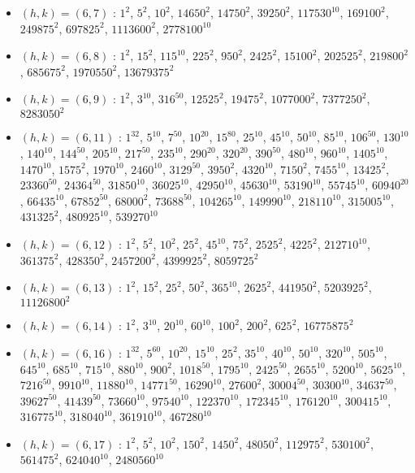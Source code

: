 \begin{itemize}
\item $(h,k)=(6,7)$ : $1^{2}$, $5^{2}$, $10^{2}$, $14650^{2}$, $14750^{2}$, $39250^{2}$, $117530^{10}$, $169100^{2}$, $249875^{2}$, $697825^{2}$, $1113600^{2}$, $2778100^{10}$
\item $(h,k)=(6,8)$ : $1^{2}$, $15^{2}$, $115^{10}$, $225^{2}$, $950^{2}$, $2425^{2}$, $15100^{2}$, $202525^{2}$, $219800^{2}$, $685675^{2}$, $1970550^{2}$, $13679375^{2}$
\item $(h,k)=(6,9)$ : $1^{2}$, $3^{10}$, $316^{50}$, $12525^{2}$, $19475^{2}$, $1077000^{2}$, $7377250^{2}$, $8283050^{2}$
\item $(h,k)=(6,11)$ : $1^{32}$, $5^{10}$, $7^{50}$, $10^{20}$, $15^{80}$, $25^{10}$, $45^{10}$, $50^{10}$, $85^{10}$, $106^{50}$, $130^{10}$, $140^{10}$, $144^{50}$, $205^{10}$, $217^{50}$, $235^{10}$, $290^{20}$, $320^{20}$, $390^{50}$, $480^{10}$, $960^{10}$, $1405^{10}$, $1470^{10}$, $1575^{2}$, $1970^{10}$, $2460^{10}$, $3129^{50}$, $3950^{2}$, $4320^{10}$, $7150^{2}$, $7455^{10}$, $13425^{2}$, $23360^{50}$, $24364^{50}$, $31850^{10}$, $36025^{10}$, $42950^{10}$, $45630^{10}$, $53190^{10}$, $55745^{10}$, $60940^{20}$, $66435^{10}$, $67852^{50}$, $68000^{2}$, $73688^{50}$, $104265^{10}$, $149990^{10}$, $218110^{10}$, $315005^{10}$, $431325^{2}$, $480925^{10}$, $539270^{10}$
\item $(h,k)=(6,12)$ : $1^{2}$, $5^{2}$, $10^{2}$, $25^{2}$, $45^{10}$, $75^{2}$, $2525^{2}$, $4225^{2}$, $212710^{10}$, $361375^{2}$, $428350^{2}$, $2457200^{2}$, $4399925^{2}$, $8059725^{2}$
\item $(h,k)=(6,13)$ : $1^{2}$, $15^{2}$, $25^{2}$, $50^{2}$, $365^{10}$, $2625^{2}$, $441950^{2}$, $5203925^{2}$, $11126800^{2}$
\item $(h,k)=(6,14)$ : $1^{2}$, $3^{10}$, $20^{10}$, $60^{10}$, $100^{2}$, $200^{2}$, $625^{2}$, $16775875^{2}$
\item $(h,k)=(6,16)$ : $1^{32}$, $5^{60}$, $10^{20}$, $15^{10}$, $25^{2}$, $35^{10}$, $40^{10}$, $50^{10}$, $320^{10}$, $505^{10}$, $645^{10}$, $685^{10}$, $715^{10}$, $880^{10}$, $900^{2}$, $1018^{50}$, $1795^{10}$, $2425^{50}$, $2655^{10}$, $5200^{10}$, $5625^{10}$, $7216^{50}$, $9910^{10}$, $11880^{10}$, $14771^{50}$, $16290^{10}$, $27600^{2}$, $30004^{50}$, $30300^{10}$, $34637^{50}$, $39627^{50}$, $41439^{50}$, $73660^{10}$, $97540^{10}$, $122370^{10}$, $172345^{10}$, $176120^{10}$, $300415^{10}$, $316775^{10}$, $318040^{10}$, $361910^{10}$, $467280^{10}$
\item $(h,k)=(6,17)$ : $1^{2}$, $5^{2}$, $10^{2}$, $150^{2}$, $1450^{2}$, $48050^{2}$, $112975^{2}$, $530100^{2}$, $561475^{2}$, $624040^{10}$, $2480560^{10}$

\end{itemize}
